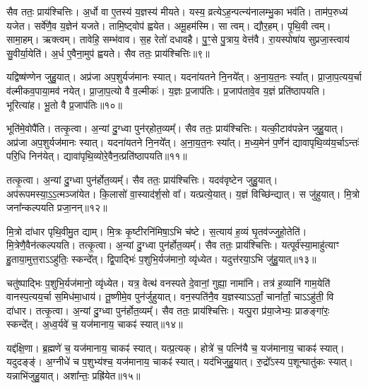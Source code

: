 सैव ततः॒ प्राय॑श्चित्तिः।
अ॒र्धो वा ए॒तस्य॑ य॒ज्ञस्य॑ मीयते।
यस्य॒ व्रत्ये\-ऽह॒न्पत्न्य॑नालम्भु॒का भव॑ति।
ताम॑प॒रुध्य॑ यजेत।
सर्वे॑णै॒व य॒ज्ञेन॑ यजते।
तामि॒ष्ट्वोप॑ ह्वयेत।
अमू॒हम॑स्मि।
सा त्वम्।
द्यौर॒हम्।
पृ॒थि॒वी त्वम्।
सामा॒हम्।
ऋक्त्वम्।
तावेहि॒ सम्भ॑वाव।
स॒ह रेतो॑ दधावहै।
पु॒ꣳ॒से पु॒त्राय॒ वेत्त॑वै।
रा॒यस्पोषा॑य सुप्रजा॒स्त्वाय॑ सु॒वीर्या॒येति॑।
अ॒र्ध ए॒वैना॒मुप॑ ह्वयते।
सैव ततः॒ प्राय॑श्चित्तिः॥९॥\ip\anuvakamend[द॒धा॒ति॒ य॒ज्ञ उ॑त॒ एक॒न्धय॑न्ति रुन्धे कुर्यादा॒र्च्छत्य॒पाकु॑र्यात्पृथि॒वी त्वम॒ष्टौ च॑ (सर्वा॒न्॒ वि वै यदि॑ परस्त॒रामोष॑धीरन्यत॒रानु॒भया॑न॒र्धो वै॥)]

यद्विष्ष॑ण्णेन जुहु॒यात्।
अप्र॑जा अप॒शुर्यज॑मानः स्यात्।
यदना॑यतने नि॒नये᳚त्।
अ॒ना॒य॒त॒नः स्या᳚त्।
प्रा॒जा॒प॒त्यय॒र्चा व॑ल्मीकव॒पाया॒मव॑ नयेत्।
प्रा॒जा॒प॒त्यो वै व॒ल्मीकः॑।
य॒ज्ञः प्र॒जा\-प॑तिः।
प्र॒जा\-प॑तावे॒व य॒ज्ञं प्रति॑\-ष्ठापयति।
भूरित्या॑ह।
भू॒तो वै प्र॒जा\-प॑तिः॥१०॥\ip

भूति॑मे॒वोपै॑ति।
तत्कृ॒त्वा।
अ॒न्यां दु॒ग्ध्वा पुन॑र्‌\mbox{}होत॒व्यम्᳚।
सैव ततः॒ प्राय॑श्चित्तिः।
यत्की॒टाव॑पन्नेन जुहु॒यात्।
अप्र॑जा अप॒शुर्यज॑मानः स्यात्।
यदना॑यतने नि॒नये᳚त्।
अ॒ना॒य॒त॒नः स्या᳚त्।
म॒ध्य॒मेन॑ प॒र्णेन॑ द्यावापृथि॒व्य॑य॒र्चा\-ऽन्तः॑ परि॒धि निन॑येत्।
द्यावा॑पृथि॒व्योरे॒वैन॒त्प्रति॑\-ष्ठापयति॥११॥\ip

तत्कृ॒त्वा।
अ॒न्यां दु॒ग्ध्वा पुन॑र्\mbox{}होत॒व्यम्᳚।
सैव ततः॒ प्राय॑श्चित्तिः।
यदव॑वृष्टेन जुहु॒यात्।
अप॑रूपमस्या॒ऽ॒ऽ॒त्मञ्जा॑येत।
कि॒लासो॑ वा॒स्याद॑र्\mbox{}श॒सो वा᳚।
यत्प्रत्ये॒यात्।
य॒ज्ञं वि\-च्छि॑न्द्यात्।
स जु॑हुयात्।
मि॒त्रो जना᳚न्कल्पयति प्रजा॒नन्॥१२॥\ip

मि॒त्रो दा॑धार पृथि॒वीमु॒त द्याम्।
मि॒त्रः कृ॒ष्टीरनि॑मिषा॒ऽभि च॑ष्टे।
स॒त्याय॑ ह॒व्यं घृ॒तव॑ज्जुहो॒तेति॑।
मि॒त्रेणै॒वैन॑त्कल्पयति।
तत्कृ॒त्वा।
अ॒न्यां दु॒ग्ध्वा पुन॑र्\mbox{}होत॒व्यम्᳚।
सैव ततः॒ प्राय॑श्चित्तिः।
यत्पूर्व॑स्या॒माहु॑त्याꣳ हु॒ताया॒मुत्त॒रा\-ऽऽहु॑तिः॒ स्कन्दे᳚त्।
द्वि॒पाद्भिः॑ प॒शुभि॒र्यज॑मानो॒ व्यृ॑ध्येत।
यदुत्त॑रया॒ऽभि जु॑हु॒यात्॥१३॥\ip

चतु॑ष्पाद्भिः प॒शुभि॒र्यज॑मानो॒ व्यृ॑ध्येत।
यत्र॒ वेत्थ॑ वनस्पते दे॒वानां॒ गुह्या॒ नामा॑नि।
तत्र॑ ह॒व्यानि॑ गाम॒येति॑ वानस्प॒त्यय॒र्चा स॒मिध॑मा॒धाय॑।
तू॒ष्णीमे॒व पुन॑र्जुहुयात्।
वन॒स्पति॑नै॒व य॒ज्ञस्याऽऽर्तां॒ चाना᳚र्तां॒ चाऽऽहु॑ती॒ वि दा॑धार।
तत्कृ॒त्वा।
अ॒न्यां दु॒ग्ध्वा पुन॑र्\mbox{}होत॒व्यम्᳚।
सैव ततः॒ प्राय॑श्चित्तिः।
यत्पु॒रा प्र॑या॒जेभ्यः॒ प्राङङ्गा॑रः॒ स्कन्दे᳚त्।
अ॒ध्व॒र्यवे॑ च॒ यज॑मानाय॒ चाकꣴ॑ स्यात्॥१४॥\ip

यद्द॑क्षि॒णा।
ब्र॒ह्मणे॑ च॒ यज॑मानाय॒ चाकꣴ॑ स्यात्।
यत्प्र॒त्यक्।
होत्रे॑ च॒ पत्नि॑यै च॒ यज॑मानाय॒ चाकꣴ॑ स्यात्।
यदुदङ्ङ्॑।
अ॒ग्नीधे॑ च प॒शुभ्य॑श्च॒ यज॑मानाय॒ चाकꣴ॑ स्यात्।
यद॑भिजुहु॒यात्।
रु॒द्रो᳚ऽस्य प॒शून्घातु॑कः स्यात्।
यन्नाभि॑जुहु॒यात्।
अशा᳚न्तः॒ प्रह्रि॑येत॥१५॥\ip

